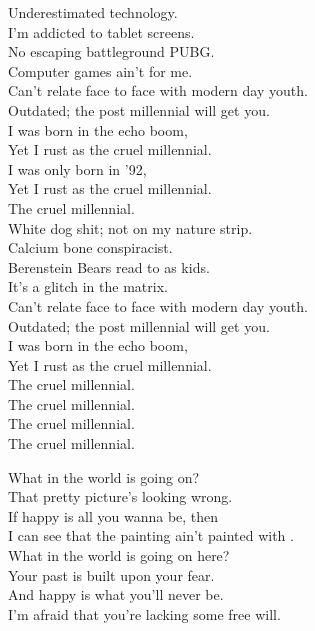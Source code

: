 
Underestimated technology. \\
I'm addicted to tablet screens. \\
No escaping battleground PUBG. \\
Computer games ain't for me. \\
Can't relate face to face with modern day youth. \\
Outdated; the post millennial will get you. \\
I was born in the echo boom, \\
Yet I rust as the cruel millennial. \\
I was only born in '92, \\
Yet I rust as the cruel millennial. \\

The cruel millennial. \\

White dog shit; not on my nature strip. \\
Calcium bone conspiracist. \\
Berenstein Bears read to as kids. \\
It's a glitch in the matrix. \\
Can't relate face to face with modern day youth. \\
Outdated; the post millennial will get you. \\
I was born in the echo boom, \\
Yet I rust as the cruel millennial. \\

The cruel millennial. \\
The cruel millennial. \\
The cruel millennial. \\
The cruel millennial. \\




What in the world is going on? \\
That pretty picture's looking wrong. \\
If happy is all you wanna be, then \\
I can see that the painting ain't painted with . \\
What in the world is going on here? \\
Your past is built upon your fear. \\
And happy is what you'll never be. \\
I'm afraid that you're lacking some free will. \\

